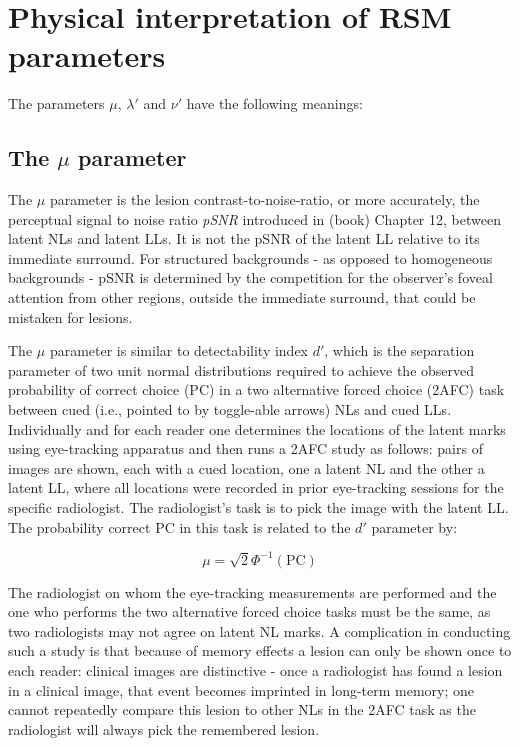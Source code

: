 \documentclass[
]{book}
\begin{document}
\hypertarget{rsm-parameter-interpretations}{%
\section{Physical interpretation of RSM parameters}\label{rsm-parameter-interpretations}}

The parameters \(\mu\), \(\lambda'\) and \(\nu'\) have the following meanings:

\hypertarget{rsm-mu-parameter}{%
\subsection{\texorpdfstring{The \(\mu\) parameter}{The \textbackslash mu parameter}}\label{rsm-mu-parameter}}

The \(\mu\) parameter is the lesion contrast-to-noise-ratio, or more accurately, the perceptual signal to noise ratio \emph{pSNR} introduced in (book) Chapter 12, between latent NLs and latent LLs. It is not the pSNR of the latent LL relative to its immediate surround. For structured backgrounds - as opposed to homogeneous backgrounds - pSNR is determined by the competition for the observer's foveal attention from other regions, outside the immediate surround, that could be mistaken for lesions.

The \(\mu\) parameter is similar to detectability index \(d'\), which is the separation parameter of two unit normal distributions required to achieve the observed probability of correct choice (PC) in a two alternative forced choice (2AFC) task between cued (i.e., pointed to by toggle-able arrows) NLs and cued LLs. Individually and for each reader one determines the locations of the latent marks using eye-tracking apparatus and then runs a 2AFC study as follows: pairs of images are shown, each with a cued location, one a latent NL and the other a latent LL, where all locations were recorded in prior eye-tracking sessions for the specific radiologist. The radiologist's task is to pick the image with the latent LL. The probability correct \(\text{PC}\) in this task is related to the \(d'\) parameter by:

\begin{equation} 
\mu = \sqrt{2} \Phi^{-1} \left ( \text{PC} \right )
\label{eq:rsm-mu-2afc}
\end{equation}

The radiologist on whom the eye-tracking measurements are performed and the one who performs the two alternative forced choice tasks must be the same, as two radiologists may not agree on latent NL marks. A complication in conducting such a study is that because of memory effects a lesion can only be shown once to each reader: clinical images are distinctive - once a radiologist has found a lesion in a clinical image, that event becomes imprinted in long-term memory; one cannot repeatedly compare this lesion to other NLs in the 2AFC task as the radiologist will always pick the remembered lesion.
\end{document}
